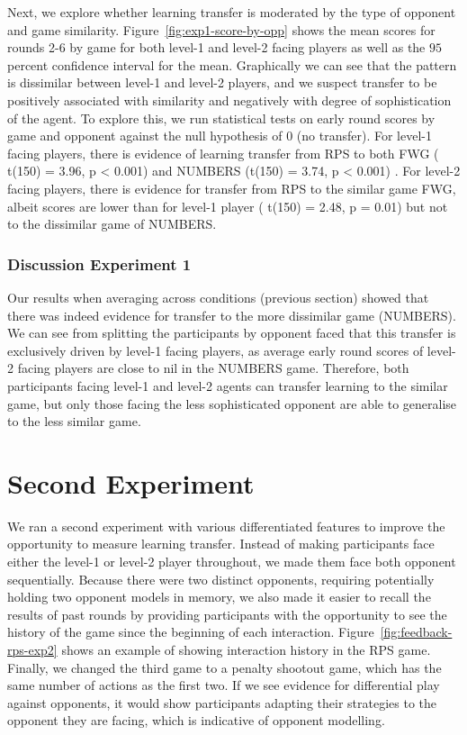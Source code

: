 \documentclass[man,floatsintext]{apa6}
\begin{document}
Next, we explore whether learning transfer is moderated by the type of opponent and game similarity. Figure~\ref{fig:exp1-score-by-opp} shows the mean scores for rounds 2-6 by game for both level-1 and level-2 facing players as well as the \(95\) percent confidence interval for the mean. Graphically we can see that the pattern is dissimilar between level-1 and level-2 players, and we suspect transfer to be positively associated with similarity and negatively with degree of sophistication of the agent. To explore this, we run statistical tests on early round scores by game and opponent against the null hypothesis of 0 (no transfer). For level-1 facing players, there is evidence of learning transfer from RPS to both FWG ( t(150) = 3.96, p \textless{} 0.001) and NUMBERS (t(150) = 3.74, p \textless{} 0.001) . For level-2 facing players, there is evidence for transfer from RPS to the similar game FWG, albeit scores are lower than for level-1 player ( t(150) = 2.48, p = 0.01) but not to the dissimilar game of NUMBERS.

\hypertarget{discussion-experiment-1}{%
\subsubsection{Discussion Experiment 1}\label{discussion-experiment-1}}

Our results when averaging across conditions (previous section) showed that there was indeed evidence for transfer to the more dissimilar game (NUMBERS). We can see from splitting the participants by opponent faced that this transfer is exclusively driven by level-1 facing players, as average early round scores of level-2 facing players are close to nil in the NUMBERS game. Therefore, both participants facing level-1 and level-2 agents can transfer learning to the similar game, but only those facing the less sophisticated opponent are able to generalise to the less similar game.

\newpage

\hypertarget{second-experiment}{%
\section{Second Experiment}\label{second-experiment}}

We ran a second experiment with various differentiated features to improve the opportunity to measure learning transfer. Instead of making participants face either the level-1 or level-2 player throughout, we made them face both opponent sequentially. Because there were two distinct opponents, requiring potentially holding two opponent models in memory, we also made it easier to recall the results of past rounds by providing participants with the opportunity to see the history of the game since the beginning of each interaction. Figure~\ref{fig:feedback-rps-exp2} shows an example of showing interaction history in the RPS game. Finally, we changed the third game to a penalty shootout game, which has the same number of actions as the first two. If we see evidence for differential play against opponents, it would show participants adapting their strategies to the opponent they are facing, which is indicative of opponent modelling.
\end{document}
